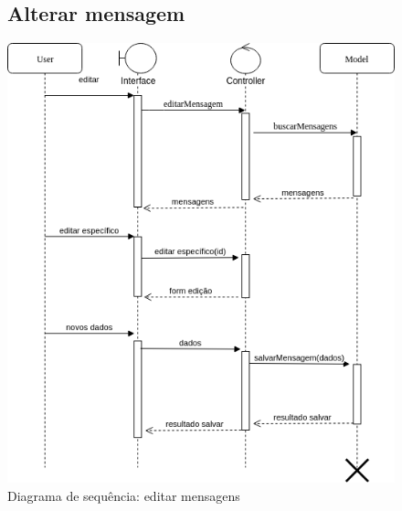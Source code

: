 \documentclass[
	12pt,				%
	openright,			%
	twoside,			%
	a4paper,			%
	english,			%
	french,				%
	spanish,			%
	brazil				%
]{abntex2}
\begin{document}
\begin{figure}[h]
	\subsection{Alterar mensagem}
	\label{figure_diagrama_sequencia_alterar_mensagem}
	\caption{Diagrama de sequência: editar mensagens}
	\includegraphics[scale=0.6]{SequenceMensagens/SequenceEditarMensagem.png}
	\hfill
\end{figure}
%
\end{document}
